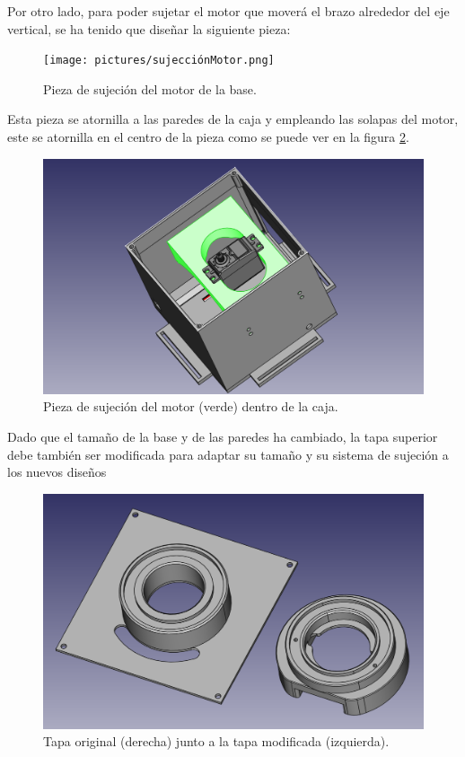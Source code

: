 Por otro lado, para poder sujetar el motor que moverá el brazo alrededor del eje vertical, se ha tenido que diseñar la siguiente pieza:
\begin{figure}[H]
    \centering
    \texttt{[image: pictures/sujecciónMotor.png]}
    \caption{Pieza de sujeción del motor de la base.}
    \label{fig:sujecion_motor}
\end{figure}

Esta pieza se atornilla a las paredes de la caja y empleando las solapas del motor, este se atornilla en el centro de la pieza como se puede ver en la figura \ref{fig:pieza_sujecio_en_caja_resaltada}.
\begin{figure}[H]
    \centering
    \includegraphics[width=.9\linewidth]{pictures/cajaConMotor.png}
    \caption{Pieza de sujeción del motor (verde) dentro de la caja.}
    \label{fig:pieza_sujecio_en_caja_resaltada}
\end{figure}

Dado que el tamaño de la base y de las paredes ha cambiado, la tapa superior debe también ser modificada para adaptar su tamaño y su sistema de sujeción a los nuevos diseños

\begin{figure}[H]
    \centering
    \includegraphics[width=.9\linewidth]{pictures/DosTapas.png}
    \caption{Tapa original (derecha) junto a la tapa modificada (izquierda).}
    \label{fig:tapas_caja}
\end{figure}


